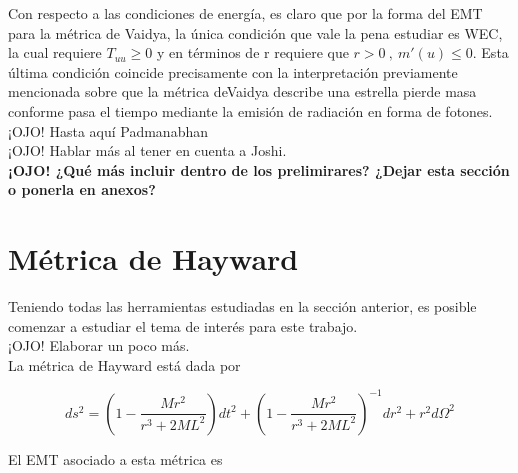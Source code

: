 \documentclass[prb,aps,preprintnumbers,amsmath,amssymb]{article}
\numberwithin{equation}{section}
\begin{document}
Con respecto a las condiciones de energía, es claro que por la forma del EMT para la métrica de Vaidya, la única condición que vale la pena estudiar es WEC, la cual requiere $T_{uu} \geq 0$ y en términos de r requiere que $r > 0\ ,\ m'(u)\leq 0 $. Esta última condición coincide precisamente con la interpretación previamente mencionada sobre que la métrica deVaidya describe una estrella pierde masa conforme pasa el tiempo mediante la emisión de radiación en forma de fotones.\\

¡OJO! Hasta aquí Padmanabhan\\

¡OJO! Hablar más al tener en cuenta a Joshi.\\

\textbf{¡OJO! ¿Qué más incluir dentro de los prelimirares? ¿Dejar esta sección o ponerla en anexos?}\\

\section{Métrica de Hayward}

Teniendo todas las herramientas estudiadas en la sección anterior, es posible comenzar a estudiar el tema de interés para este trabajo.\\

¡OJO! Elaborar un poco más.\\

La métrica de Hayward está dada por 

\begin{equation}
ds^2 = \left( 1 - \frac{Mr^2}{r^3 + 2ML^2} \right) dt^2 + \left( 1 - \frac{Mr^2}{r^3 + 2ML^2} \right)^{-1} dr^2 + r^2d\Omega ^2
\end{equation}

El EMT asociado a esta métrica es
\end{document}
